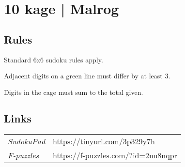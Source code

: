\section[10 kage | Malrog {[\emph{6\emph{x}6 Sudoku, Whispers, Killer Cage}]}]{10 kage | {\normalfont Malrog}}
\label{sec:53-10-kage-malrog}

\subsection*{Rules}
\begin{markdown}
Standard 6x6 sudoku rules apply.

Adjacent digits on a green line must differ by at least 3.

Digits in the cage must sum to the total given.
\end{markdown}
\subsection*{Links}
\begin{tabularx}{\textwidth}{l X}
\emph{SudokuPad} & \url{https://tinyurl.com/3p329y7h} \\
\emph{F-puzzles} & \url{https://f-puzzles.com/?id=2nu8nqpr} \\
\end{tabularx}
\pagebreak
